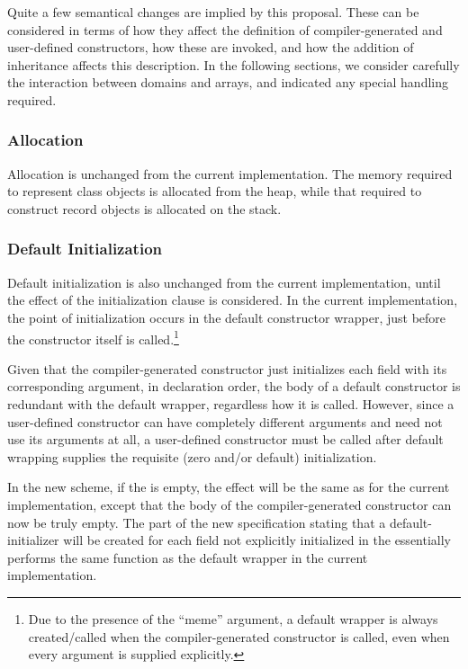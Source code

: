 Quite a few semantical changes are implied by this proposal.  These can be
considered in terms of how they affect the definition of compiler-generated and
user-defined constructors, how these are invoked, and how the addition of
inheritance affects this description.  In the following sections, we consider carefully the interaction
between domains and arrays, and indicated any special handling required.

\subsubsection{Allocation}

Allocation is unchanged from the current implementation.  The memory
required to represent class objects is allocated from the heap, while that
required to construct record objects is allocated on the stack.  

\subsubsection{Default Initialization} 
Default initialization is also unchanged from the current
implementation, until the effect of the initialization clause is considered.  In
the current implementation, the point of initialization occurs in the default
constructor wrapper, just before the constructor itself is called.\footnote{Due
to the presence of the ``meme'' argument, a default wrapper is always
created/called when the compiler-generated constructor is called, even when
every argument is supplied explicitly.}  

Given that the compiler-generated
constructor just initializes each field with its corresponding argument, in
declaration order, the body of a default constructor is redundant with the
default wrapper, regardless how it is called.  However, since a user-defined
constructor can have completely different arguments and need not use its
arguments at all, a user-defined constructor must be called after default
wrapping supplies the requisite (zero and/or default) initialization.

In the new scheme, if the  is empty, the effect will
be the same as for the current implementation, except that the body of the
compiler-generated constructor can now be truly empty.  The part of the
new specification stating that a default-initializer will be created for each
field not explicitly initialized in the  essentially
performs the same function as the default wrapper in the current implementation.

